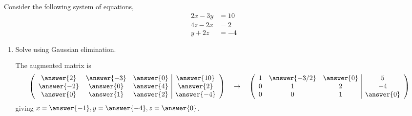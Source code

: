 \documentclass{ximera}
\begin{document}
\begin{exercise}
  Consider the following system of equations,
  \begin{align*}
    2x-3y&= 10\\
    4z -2x &= 2\\
    y+2z &= -4
  \end{align*}

  \begin{enumerate}
  \item Solve using Gaussian elimination.
    \begin{prompt}
      The augmented matrix is
      \[
        \left(
          \begin{array}{ccc|c}
            \answer{2} & \answer{-3} & \answer{0} & \answer{10}  \\
            \answer{-2} & \answer{0} & \answer{4} & \answer{2}  \\
            \answer{0} & \answer{1} & \answer{2} & \answer{-4}
          \end{array}
        \right)
        \quad \rightarrow \quad
        \left(
          \begin{array}{ccc|c}
            1 & \answer{-3/2} & \answer{0} & 5  \\
            0 &1 & 2& -4  \\
            0 & 0 & 1 & \answer{0}
          \end{array}
        \right)
      \]
      giving $x = \answer{-1}, y= \answer{-4}, z= \answer{0}$.
    \end{prompt}


\end{enumerate}
\end{exercise}
\end{document}
